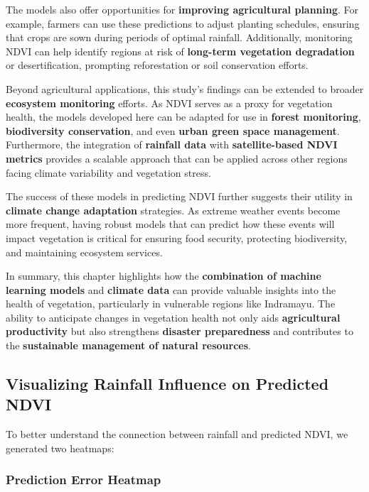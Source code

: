 \documentclass[
]{article}
\begin{document}
The models also offer opportunities for \textbf{improving agricultural
planning}. For example, farmers can use these predictions to adjust
planting schedules, ensuring that crops are sown during periods of
optimal rainfall. Additionally, monitoring NDVI can help identify
regions at risk of \textbf{long-term vegetation degradation} or
desertification, prompting reforestation or soil conservation efforts.

Beyond agricultural applications, this study's findings can be extended
to broader \textbf{ecosystem monitoring} efforts. As NDVI serves as a
proxy for vegetation health, the models developed here can be adapted
for use in \textbf{forest monitoring}, \textbf{biodiversity
conservation}, and even \textbf{urban green space management}.
Furthermore, the integration of \textbf{rainfall data} with
\textbf{satellite-based NDVI metrics} provides a scalable approach that
can be applied across other regions facing climate variability and
vegetation stress.

The success of these models in predicting NDVI further suggests their
utility in \textbf{climate change adaptation} strategies. As extreme
weather events become more frequent, having robust models that can
predict how these events will impact vegetation is critical for ensuring
food security, protecting biodiversity, and maintaining ecosystem
services.

In summary, this chapter highlights how the \textbf{combination of
machine learning models} and \textbf{climate data} can provide valuable
insights into the health of vegetation, particularly in vulnerable
regions like Indramayu. The ability to anticipate changes in vegetation
health not only aids \textbf{agricultural productivity} but also
strengthens \textbf{disaster preparedness} and contributes to the
\textbf{sustainable management of natural resources}.

\subsection{Visualizing Rainfall Influence on Predicted
NDVI}\label{visualizing-rainfall-influence-on-predicted-ndvi}

To better understand the connection between rainfall and predicted NDVI,
we generated two heatmaps:

\subsubsection{Prediction Error Heatmap}\label{prediction-error-heatmap}
\end{document}
